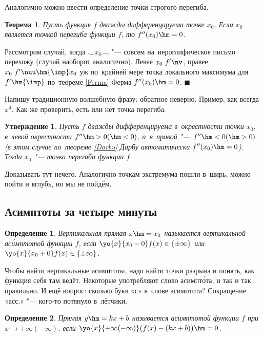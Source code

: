 \documentclass[a4paper,10pt,twoside]{article}
\newtheorem{Def}{Определение}[section]
\newtheorem{The}{Теорема}[section]
\newtheorem{Ut}{Утверждение}[section]
\newenvironment{Proof}
       {\par\noindent{\textbf{Доказательство.}}}
       {\hfill$\scriptstyle\blacksquare$}
\begin{document}
Аналогично можно ввести определение точки строгого перегиба.


\begin{The}
Пусть функция $f$ дважды дифференцируема точке $x_0$. Если $x_0$ является точкой перегиба функции $f$, то $f''(x_0)\hm=0$.
\end{The}

\begin{Proof}
    Рассмотрим случай, когда $\smile x_0 \frown$ "--- совсем на~иероглифическое письмо перехожу (случай наоборот аналогично). Левее $x_0\ f'\nv$, правее
    $x_0\ f'\nuu\hm{\imp} x_0$ уж по~крайней мере точка локального максимума для $f'\hm{\imp}$ по~теореме \ref{Ferma} Ферма $f''(x_0)\hm=0$.
\end{Proof}

Напишу традиционную волшебную фразу: обратное неверно. Пример, как всегда $x^4$. Как же проверить, есть или нет точка перегиба.

\begin{Ut}
  Пусть $f$ дважды дифференцируема в~окрестности точки $x_0$, в~левой окрестности $f''\hm>0 (\hm<0)$, а~в~правой "--- $f''\hm<0 (\hm>0)$ (в этом случае
  по~теореме \ref{Darbu} Дарбу автоматически $f''(x_0)\hm=0$). Тогда $x_0$ "--- точка перегиба функции $f$.
\end{Ut}

Доказывать тут нечего. Аналогично точкам экстремума пошли в~ширь, можно пойти и вглубь, но мы не пойдём.

\subsection{Асимптоты за четыре минуты}

\begin{Def}
  Вертикальная прямая $x\hm=x_0$ называется вертикальной ас\'{и}мптотой функции $f$, если $\yo{x}{x_0-0} f(x)\in\{\pm\infty\}$ или $\yo{x}{x_0+0}f(x)\in\{\pm\infty\}$.
\end{Def}

Чтобы найти вертикальные асимптоты, надо найти точки разрыва и понять, как функция себя там ведёт. Некоторые употребляют слово асимпт\'{о}та, и так и  так правильно.
И ещё вопрос: сколько букв «с» в~слове асимптота? Сокращение «асс.» "--- кого-то потянуло в~лётчики.

\begin{Def}
  Прямая $y\hm=kx+b$ называется асимптотой функции $f$ при $x\to+\infty(-\infty)$, если $\yo{x}{+\infty(-\infty)}\big(f(x)-(kx+b)\big)\hm=0$.

\end{Def}
\end{document}
